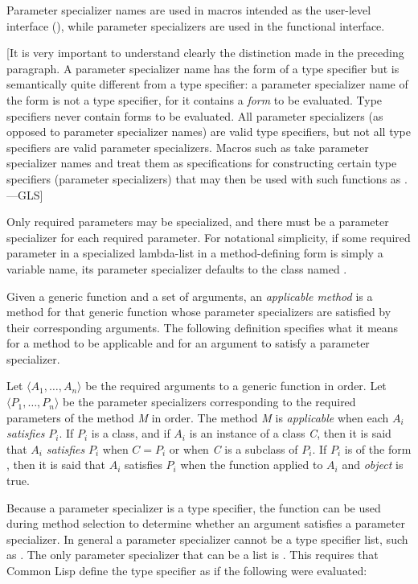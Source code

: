 Parameter specializer names are used in macros intended as the
user-level interface (), while parameter specializers
are used in the functional interface.

[It is very important to understand clearly the distinction made
in the preceding paragraph.  A parameter specializer name
has the form of a type specifier but is semantically quite different
from a type specifier: a parameter specializer name of the form
 is not a type specifier, for it contains
a \emph{form} to be evaluated.   Type specifiers
never contain forms to be evaluated.  All parameter specializers
(as opposed to parameter specializer names) are valid type specifiers,
but not all type specifiers are valid parameter specializers.  Macros such as 
take parameter specializer names and treat them as specifications for
constructing certain type specifiers (parameter specializers) that may then be used
with such functions as .---GLS]

Only required parameters may be specialized, and there must be a
parameter specializer for each required parameter.  For notational
simplicity, if some required parameter in a specialized lambda-list in
a method-defining form is simply a variable name, its parameter
specializer defaults to the class named .

Given a generic function and a set of arguments, an \emph{applicable
method} is a method for that generic function whose parameter
specializers are satisfied by their corresponding arguments.  The
following definition specifies what it means for a method to be
applicable and for an argument to satisfy a parameter specializer.

Let $\langle A_1, \ldots, A_{n}\rangle$ be the required
arguments to a generic function in order. Let $\langle P_1,
\ldots, P_{n}\rangle$ be the parameter specializers corresponding to
the required parameters of the method \emph{M} in order.  The method \emph{M} is
\emph{applicable} when each $A_{i}$
\emph{satisfies} $P_{i}$.
If $P_{i}$ is a class,
and if $A_{i}$ is an instance of a class
\emph{C}, then it is said that $A_{i}$ \emph{satisfies}
$P_{i}$ when $C=P_{i}$ or when \emph{C} is a subclass of $P_{i}$.  If
$P_{i}$ is of the form
, then it is said that
$A_{i}$ satisfies $P_{i}$
when the function  applied to
$A_{i}$ and \emph{object} is true.

Because a parameter specializer is a type specifier, the function 
 can be used during method selection to determine whether an
argument satisfies a parameter specializer.  In general a
parameter specializer cannot be a type specifier list, such as 
.  The only parameter specializer that can
be a list is .  This requires that
Common Lisp define the type specifier 
as if the following were evaluated:

